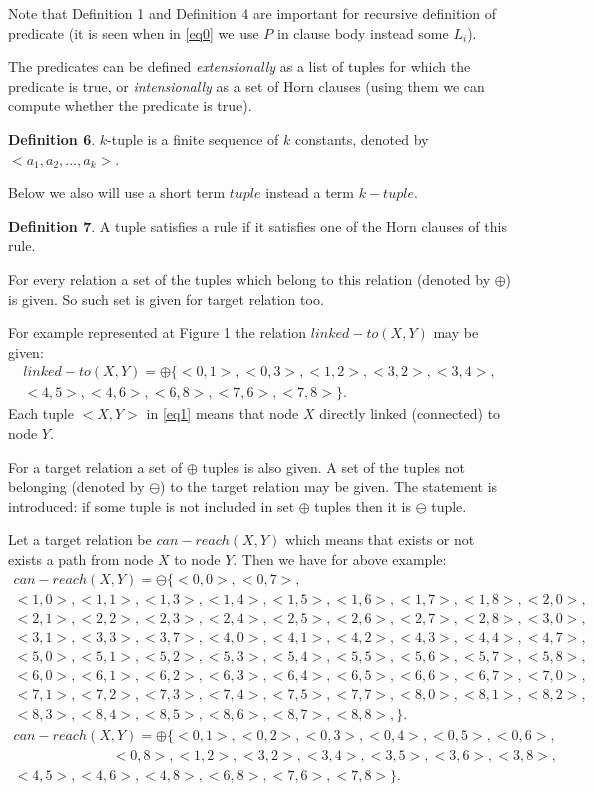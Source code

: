 \documentclass{scrartcl}
\begin{document}
Note that Definition 1 and Definition 4 are important
for recursive definition of predicate
 (it is seen when in \eqref{eq0}  we use $P$ in clause body instead some $L_i$).

The predicates can be defined \emph{extensionally} as a list of tuples
for which the predicate is true, or \emph{intensionally} as a set of Horn clauses (using them we can compute whether the predicate is true).


\textbf{Definition 6}.
$k$-tuple is a finite sequence of $k$ constants,
denoted by $<a_1, a_2, \ldots, a_k>$.

Below we also will use a short term $tuple$ instead a term $k-tuple$.

\textbf{Definition 7}.
A tuple satisfies a rule if it satisfies one of the Horn clauses
of this rule.

For every relation a set of the tuples  which
 belong to this relation (denoted by $\oplus$) is given.
  So such set is given for target relation too.

For example represented at Figure 1 the relation $linked-to(X,Y)$
may be given:
\begin{multline}\label{eq1}
linked-to (X,Y) =
\oplus\{<0,1>, <0,3>, <1,2>, <3,2>, <3,4>,\\ <4,5>, <4,6>, <6,8>, <7,6>, <7,8>\}.
\end{multline}
Each tuple $<X,Y>$ in \eqref{eq1} means that node $X$ directly
linked (connected)
to node $Y$.

For a target relation a set of $\oplus$ tuples is also given.
A set of the tuples not belonging (denoted by $\ominus$) to the target relation
 may be given.
The statement is introduced: if some tuple is
not included in set $\oplus$ tuples
 then it is $\ominus$ tuple.

Let a target relation be $can-reach(X,Y)$
which means that exists or not exists a path from node $X$ to node $Y$. Then we have for
above example:
\begin{multline}\label{eq3}
can-reach(X,Y)=\ominus\{<0,0>, <0,7>,  \\
<1,0>,<1,1>,<1,3>, <1,4>,<1,5>,<1,6>,<1,7>,<1,8>,<2,0>,\\
 <2,1 >, <2,2 >, <2,3 >, <2,4 >, <2,5 >, <2,6 >, <2,7 >, <2,8 >,< 3,0>, \\
 <3,1 >, <3,3 >, <3,7 >,  < 4,0>, <4,1 >, <4,2 >, <4,3 >, <4,4 >, <4,7 >, \\
  <5,0>, <5,1 >, <5,2 >, <5,3 >, <5,4 >, <5,5 >, <5,6 >, <5,7 >, <5,8 >,\\
  <6,0>, <6,1 >, <6,2 >, <6,3 >, <6,4 >, <6,5 >, <6,6 >, <6,7 >,< 7,0>,\\
   <7,1 >, <7,2 >, <7,3 >, <7,4 >, <7,5 >,  <7,7 >,<8,0>,<8,1 >,<8,2 >, \\
    <8,3 >, <8,4 >, <8,5 >, <8,6 >, <8,7 >, <8,8 >,\}.
\end{multline}
\begin{multline}\label{eq2}
can-reach(X,Y)=\oplus\{<0,1>, <0,2>, <0,3>, <0,4>,<0,5>, <0,6>, \\
\qquad\quad\qquad\qquad<0,8>,<1,2>,<3,2>, <3,4>,<3,5>, <3,6>, <3,8>,\\
<4,5>, <4,6>,<4,8>,<6,8>, <7,6>, <7,8>\}.
\end{multline}
\end{document}
